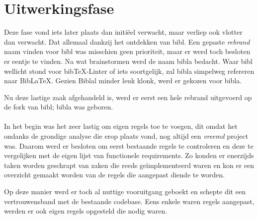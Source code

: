 \chapter{Uitwerkingsfase}
\label{ch:uitwerkingsfase}


Deze fase vond iets later plaats dan initiëel verwacht, maar verliep ook vlotter dan verwacht. Dat allemaal dankzij het ontdekken van bibl. Een gepaste \emph{rebrand} naam vinden voor bibl was misschien geen prioriteit, maar er werd toch besloten er eentje te vinden. Na wat brainstormen werd de naam bibla bedacht. Waar bibl wellicht stond voor bibTeX-Linter of iets soortgelijk, zal bibla simpelweg refereren naar BibLaTeX. Gezien Biblal minder leuk klonk, werd er gekozen voor bibla.

Nu deze lastige zaak afgehandeld is, werd er eerst een hele rebrand uitgevoerd op de fork van bibl; bibla was geboren.
\\
\\
In het begin was het zeer lastig om eigen regels toe te voegen, dit omdat het ondanks de grondige analyse die erop plaats vond, nog altijd een \emph{vreemd} project was. Daarom werd er besloten om eerst bestaande regels te controleren en deze te vergelijken met de eigen lijst van functionele requirements.
Zo konden er enerzijds taken worden geschrapt van zaken die reeds geïmplementeerd waren en kon er een overzicht gemaakt worden van de regels die aangepast diende te worden. 

Op deze manier werd er toch al nuttige vooruitgang geboekt en schepte dit een vertrouwensband met de bestaande codebase. Eens enkele waren regels aangepast, werden er ook eigen regels opgesteld die nodig waren.
